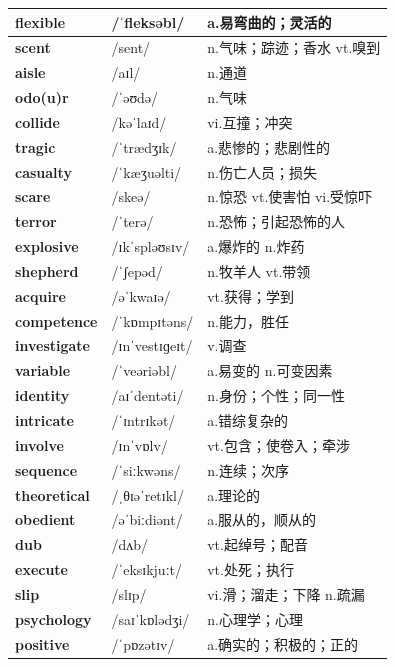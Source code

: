 \documentclass[14pt,a4paper]{extarticle}
\begin{document}
\begin{longtable}{ p{} p{} p{} }
\textbf{flexible} & /ˈfleksəbl/ & a.易弯曲的；灵活的 \\ \hline
\textbf{scent} & /sent/ & n.气味；踪迹；香水 \quad vt.嗅到 \\ \hline
\textbf{aisle} & /aɪl/ & n.通道 \\ \hline
\textbf{odo(u)r} & /ˈəʊdə/ & n.气味 \\ \hline
\textbf{collide} & /kəˈlaɪd/ & vi.互撞；冲突 \\ \hline
\textbf{tragic} & /ˈtrædʒɪk/ & a.悲惨的；悲剧性的 \\ \hline
\textbf{casualty} & /ˈkæʒuəlti/ & n.伤亡人员；损失 \\ \hline
\textbf{scare} & /skeə/ & n.惊恐 \quad vt.使害怕 \quad vi.受惊吓 \\ \hline
\textbf{terror} & /ˈterə/ & n.恐怖；引起恐怖的人 \\ \hline
\textbf{explosive} & /ɪkˈspləʊsɪv/ & a.爆炸的 \quad n.炸药 \\ \hline
\textbf{shepherd} & /ˈʃepəd/ & n.牧羊人 \quad vt.带领 \\ \hline
\textbf{acquire} & /əˈkwaɪə/ & vt.获得；学到 \\ \hline
\textbf{competence} & /ˈkɒmpɪtəns/ & n.能力，胜任 \\ \hline
\textbf{investigate} & /ɪnˈvestɪɡeɪt/ & v.调查 \\ \hline
\textbf{variable} & /ˈveəriəbl/ & a.易变的 \quad n.可变因素 \\ \hline
\textbf{identity} & /aɪˈdentəti/ & n.身份；个性；同一性 \\ \hline
\textbf{intricate} & /ˈɪntrɪkət/ & a.错综复杂的 \\ \hline
\textbf{involve} & /ɪnˈvɒlv/ & vt.包含；使卷入；牵涉 \\ \hline
\textbf{sequence} & /ˈsiːkwəns/ & n.连续；次序 \\ \hline
\textbf{theoretical} & /ˌθɪəˈretɪkl/ & a.理论的 \\ \hline
\textbf{obedient} & /əˈbiːdiənt/ & a.服从的，顺从的 \\ \hline
\textbf{dub} & /dʌb/ & vt.起绰号；配音 \\ \hline
\textbf{execute} & /ˈeksɪkjuːt/ & vt.处死；执行 \\ \hline
\textbf{slip} & /slɪp/ & vi.滑；溜走；下降 \quad n.疏漏 \\ \hline
\textbf{psychology} & /saɪˈkɒlədʒi/ & n.心理学；心理 \\ \hline
\textbf{positive} & /ˈpɒzətɪv/ & a.确实的；积极的；正的 \\ \hline

\end{longtable}
\end{document}
